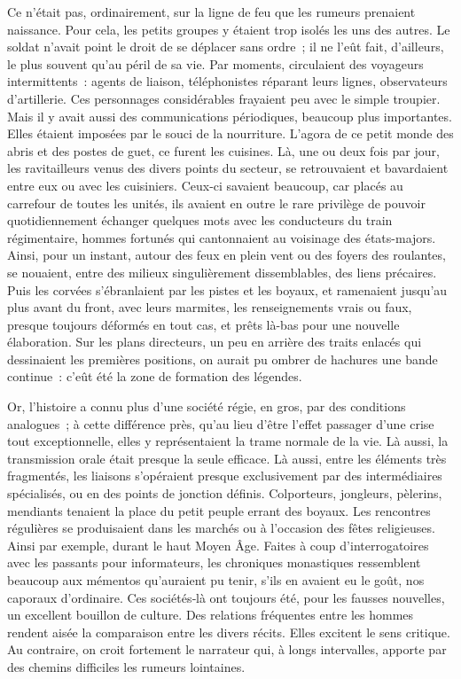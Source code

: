 \documentclass[french,twoside]{book} %
\begin{document}
Ce n’était pas, ordinairement, sur la ligne de feu que les rumeurs prenaient naissance. Pour cela, les petits groupes y étaient trop isolés les uns des autres. Le soldat n’avait point le droit de se déplacer sans ordre ; il ne l’eût fait, d’ailleurs, le plus souvent qu’au péril de sa vie. Par mo­ments, circulaient des voyageurs intermittents : agents de liaison, télé­phonistes réparant leurs lignes, observateurs d’artillerie. Ces personnages considérables frayaient peu avec le simple troupier. Mais il y avait aussi des communications périodiques, beaucoup plus importantes. Elles étaient imposées par le souci de la nourriture. L’agora de ce petit monde des abris et des postes de guet, ce furent les cuisines. Là, une ou deux fois par jour, les ravitailleurs venus des divers points du secteur, se retrou­vaient et bavardaient entre eux ou avec les cuisiniers. Ceux-ci savaient beaucoup, car placés au carrefour de toutes les unités, ils avaient en outre le rare privilège de pouvoir quotidiennement échanger quelques mots avec les conducteurs du train régimentaire, hommes fortunés qui cantonnaient au voisinage des états-majors. Ainsi, pour un instant, autour des feux en plein vent ou des foyers des roulantes, se nouaient, entre des milieux singulièrement dissemblables, des liens précaires. Puis les corvées s’ébranlaient par les pistes et les boyaux, et ramenaient jusqu’au plus avant du front, avec leurs marmites, les renseignements vrais ou faux, presque toujours déformés en tout cas, et prêts là-bas pour une nouvelle élaboration. Sur les plans directeurs, un peu en arrière des traits enlacés qui dessinaient les premières positions, on aurait pu ombrer de hachures une bande continue : c’eût été la zone de formation des légendes.\par
Or, l’histoire a connu plus d’une société régie, en gros, par des condi­tions analogues ; à cette différence près, qu’au lieu d’être l’effet passager d’une crise tout exceptionnelle, elles y représentaient la trame normale de la vie. Là aussi, la transmission orale était presque la seule efficace. Là aussi, entre les éléments très fragmentés, les liaisons s’opéraient pres­que exclusivement par des intermédiaires spécialisés, ou en des points de jonction définis. Colporteurs, jongleurs, pèlerins, mendiants tenaient la place du petit peuple errant des boyaux. Les rencontres régulières se produisaient dans les marchés ou à l’occasion des fêtes religieuses. Ainsi par exemple, durant le haut Moyen Âge. Faites à coup d’interrogatoires avec les passants pour informateurs, les chroniques monastiques ressem­blent beaucoup aux mémentos qu’auraient pu tenir, s’ils en avaient eu le goût, nos caporaux d’ordinaire. Ces sociétés‑là ont toujours été, pour les fausses nouvelles, un excellent bouillon de culture. Des relations  
\label{p52} fréquentes entre les hommes rendent aisée la comparaison entre les divers récits. Elles excitent le sens critique. Au contraire, on croit fortement le narrateur qui, à longs intervalles, apporte par des chemins difficiles les rumeurs lointaines.
\end{document}
